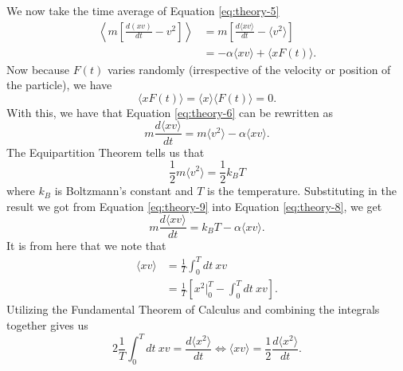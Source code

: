 \documentclass[twocolumn,amsmath,amssymb,pra, floatfix]{revtex4-2}
\begin{document}
We now take the time average of Equation \ref{eq:theory-5}
\begin{align}
    \left\langle
        m
        \left[
            \frac{ d ( x v ) }{ d t } - v^{ 2 }
        \right]
    \right\rangle
    &=
    m
    \left[
        \frac{ d \langle x v \rangle }{ d t }
        -
        \langle v^{ 2 } \rangle 
    \right]
    \nonumber
    \\
    &=
    - \alpha \langle x v \rangle + \langle x F( t ) \rangle.
    \label{eq:theory-6}
\end{align}
Now because $F( t )$ varies randomly (irrespective of the velocity or position of the particle), we have 
\begin{equation}
    \langle x F( t ) \rangle
    =
    \langle x \rangle \langle F( t ) \rangle 
    =
    0.
    \label{eq:theory-7}
\end{equation}
With this, we have that Equation \ref{eq:theory-6} can be rewritten as 
\begin{equation}
    m \frac{ d \langle x v \rangle }{ d t }
    =
    m \langle v^{ 2 } \rangle - \alpha \langle x v \rangle.
    \label{eq:theory-8}
\end{equation}
The Equipartition Theorem tells us that 
\begin{equation}
    \frac{1}{2} m \langle v^{ 2 } \rangle 
    =
    \frac{1}{2} k_{B} T
    \label{eq:theory-9}
\end{equation}
where $k_{B}$ is Boltzmann's constant and $T$ is the temperature.  Substituting in the result we got from Equation 
\ref{eq:theory-9} into Equation \ref{eq:theory-8}, we get 
\begin{equation}
    m \frac{ d \langle x v \rangle }{ d t }
    =
    k_{B} T - \alpha \langle x v \rangle.
    \label{eq:theory-10}
\end{equation}
It is from here that we note that 
\begin{align}
    \langle x v \rangle
    &= 
    \frac{1}{T} \int_{0}^{T} dt \ x v 
    \nonumber 
    \\
    &= 
    \frac{1}{T}
    \left[ 
        x^{2} \biggr\vert_{0}^{T} - \int_{0}^{T} dt \ x v 
    \right].
    \label{eq:theory-11}
\end{align}
Utilizing the Fundamental Theorem of Calculus and combining the integrals together gives us 
\begin{equation}
    2 \frac{1}{T} \int_{0}^{T} dt \ x v 
    =
    \frac{ d \langle x^{2} \rangle }{ d t }
    \iff 
    \langle x v \rangle
    =
    \frac{1}{2}
    \frac{ d \langle x^{2} \rangle }{ d t }.
    \label{eq:theory-12}
\end{equation}
\end{document}
